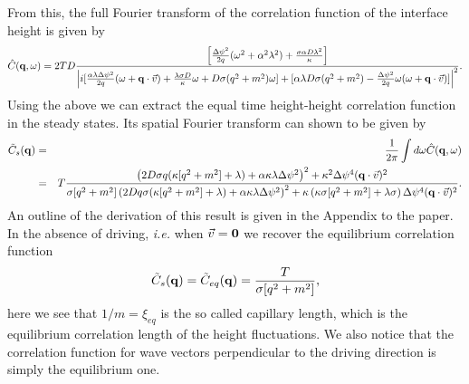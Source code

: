 From this, the full Fourier transform of the correlation function of the interface height is given by
\begin{equation}
\hat C({\bf q},\omega)  = 2TD \frac{\left[ \frac{\Delta\psi^2}{2q}(\omega^2+\alpha^2 \lambda^2) + \frac{\sigma\alpha D\lambda^2}{\kappa}\right]}{\left|i[\frac{\alpha\lambda\Delta\psi^2}{2 q}(\omega + {\bf q}\cdot\vec{v}) + \frac{\lambda \sigma D}{\kappa}\omega + D\sigma(q^2+m^2)\omega]
+[\alpha\lambda D\sigma(q^2+m^2) -\frac{\Delta\psi^2}{2q}\omega(\omega+{\bf q}\cdot\vec{v})]\right|^2}.
\end{equation}
Using the above we can extract the equal time height-height correlation function in the steady states. Its spatial Fourier transform can shown to be given by
\begin{eqnarray}
\tilde C_s({\bf q}) &=& \frac{1}{2\pi} \int d\omega \hat C({\bf q}, \omega)\nonumber\\
&=&T \frac{\left(2 D\sigma q(\kappa[q^2+m^2]+\lambda)+\alpha\kappa\lambda\Delta\psi^2\right)^2 +\kappa^2 \Delta\psi^4 ({\bf q}\cdot\vec{v})^2}{\sigma[q^2+m^2]\left(2D q\sigma (\kappa[q^2+m^2]+\lambda)+\alpha \kappa\lambda \Delta\psi^2\right)^2 + \kappa\left(\kappa\sigma[q^2+m^2] + \lambda\sigma\right)\Delta\psi^4({\bf q}\cdot\vec{v})^2}.\label{eqmaind}
\end{eqnarray}
An outline of the derivation of this result is given in the Appendix to the paper.
In the absence of driving, {\em i.e.} when $\vec{v}={\bf 0}$ we recover the equilibrium correlation function
\begin{equation}
\tilde C_s({\bf q})= \tilde C_{eq}({\bf q})= \frac{T}{\sigma[q^2+m^2]},
\end{equation} 
here we see that  $1/m= \xi_{eq}$ is the so called capillary length, which is the equilibrium correlation length of the height fluctuations. We also notice that the correlation function for wave vectors perpendicular to the driving direction is simply the equilibrium one.

